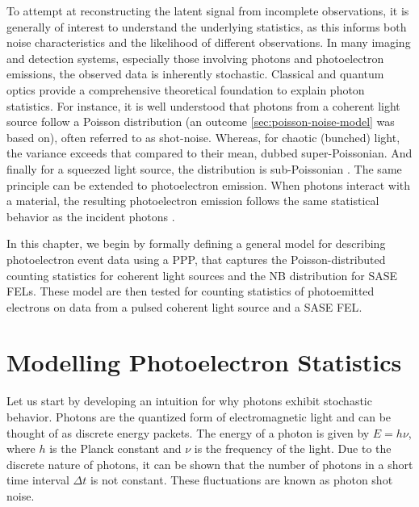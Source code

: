 To attempt at reconstructing the latent signal from incomplete observations, it is generally of interest to understand the underlying statistics, as this informs both noise characteristics and the likelihood of different observations. In many imaging and detection systems, especially those involving photons and photoelectron emissions, the observed data is inherently stochastic. Classical and quantum optics provide a comprehensive theoretical foundation to explain photon statistics. For instance, it is well understood that photons from a coherent light source follow a Poisson distribution (an outcome \cref{sec:poisson-noise-model} was based on), often referred to as shot-noise. Whereas, for chaotic (bunched) light, the variance exceeds that compared to their mean, dubbed super-Poissonian. And finally for a squeezed light source, the distribution is sub-Poissonian \cite[Chapter~5]{foxQuantumOpticsIntroduction2006}. The same principle can be extended to photoelectron emission. When photons interact with a material, the resulting photoelectron emission follows the same statistical behavior as the incident photons \cite{mandelFluctuationsPhotonBeams1958,mandelFluctuationsPhotonBeams1959}. 

In this chapter, we begin by formally defining a general model for describing photoelectron event data using a \gls{PPP}, that captures the Poisson-distributed counting statistics for coherent light sources and the \gls{NB} distribution for \gls{SASE} \glspl{FEL}. These model are then tested for counting statistics of photoemitted electrons on data from a pulsed coherent light source and a \gls{SASE} \gls{FEL}.

\section{Modelling Photoelectron Statistics}\label{section:photoelectron-counting-stats}
Let us start by developing an intuition for why photons exhibit stochastic behavior. Photons are the quantized form of electromagnetic light and can be thought of as discrete energy packets. The energy of a photon is given by $E = h\nu$, where $h$ is the Planck constant and $\nu$ is the frequency of the light. Due to the discrete nature of photons, it can be shown that the number of photons in a short time interval $\Delta t$ is not constant. These fluctuations are known as photon shot noise.

